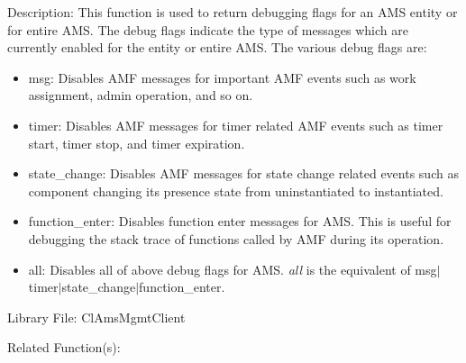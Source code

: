 \begin{Desc}
\item[Description:]This function is used to return debugging flags for an AMS entity or for entire AMS. The debug flags indicate the type of messages which are currently enabled for the entity or entire AMS. The various debug flags are: \begin{itemize}
\item msg: Disables AMF messages for important AMF events such as work assignment, admin operation, and so on. \item timer: Disables AMF messages for timer related AMF events such as timer start, timer stop, and timer expiration. \item state\_\-change: Disables AMF messages for state change related events such as component changing its presence state from uninstantiated to instantiated. \item function\_\-enter: Disables function enter messages for AMS. This is useful for debugging the stack trace of functions called by AMF during its operation. \item all: Disables all of above debug flags for AMS. {\em all\/} is the equivalent of msg$|$timer$|$state\_\-change$|$function\_\-enter.\end{itemize}
\end{Desc}
\begin{Desc}
\item[Library File:]Cl\-Ams\-Mgmt\-Client\end{Desc}
\begin{Desc}
\item[Related Function(s):] \end{Desc}


